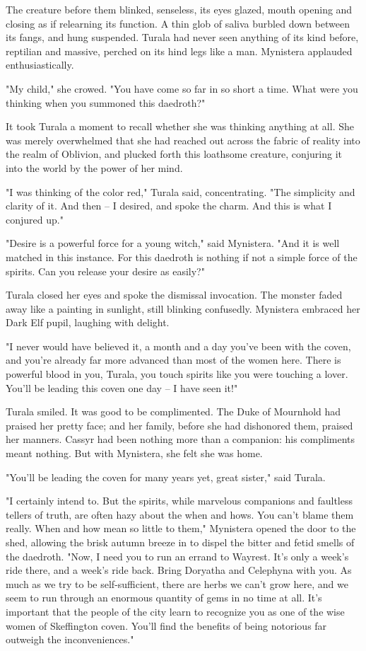 \clearpage
{}

\dropcap The creature before them blinked, senseless, its eyes glazed, mouth opening and closing as if relearning its function. A thin glob of saliva burbled down between its fangs, and hung suspended. Turala had never seen anything of its kind before, reptilian and massive, perched on its hind legs like a man. Mynistera applauded enthusiastically.

"My child," she crowed. "You have come so far in so short a time. What were you thinking when you summoned this daedroth?"

It took Turala a moment to recall whether she was thinking anything at all. She was merely overwhelmed that she had reached out across the fabric of reality into the realm of Oblivion, and plucked forth this loathsome creature, conjuring it into the world by the power of her mind.

"I was thinking of the color red," Turala said, concentrating. "The simplicity and clarity of it. And then -- I desired, and spoke the charm. And this is what I conjured up."

"Desire is a powerful force for a young witch," said Mynistera. "And it is well matched in this instance. For this daedroth is nothing if not a simple force of the spirits. Can you release your desire as easily?"

Turala closed her eyes and spoke the dismissal invocation. The monster faded away like a painting in sunlight, still blinking confusedly. Mynistera embraced her Dark Elf pupil, laughing with delight.

"I never would have believed it, a month and a day you've been with the coven, and you're already far more advanced than most of the women here. There is powerful blood in you, Turala, you touch spirits like you were touching a lover. You'll be leading this coven one day -- I have seen it!"

Turala smiled. It was good to be complimented. The Duke of Mournhold had praised her pretty face; and her family, before she had dishonored them, praised her manners. Cassyr had been nothing more than a companion: his compliments meant nothing. But with Mynistera, she felt she was home.

"You'll be leading the coven for many years yet, great sister," said Turala.

"I certainly intend to. But the spirits, while marvelous companions and faultless tellers of truth, are often hazy about the when and hows. You can't blame them really. When and how mean so little to them," Mynistera opened the door to the shed, allowing the brisk autumn breeze in to dispel the bitter and fetid smells of the daedroth. "Now, I need you to run an errand to Wayrest. It's only a week's ride there, and a week's ride back. Bring Doryatha and Celephyna with you. As much as we try to be self-sufficient, there are herbs we can't grow here, and we seem to run through an enormous quantity of gems in no time at all. It's important that the people of the city learn to recognize you as one of the wise women of Skeffington coven. You'll find the benefits of being notorious far outweigh the inconveniences."

